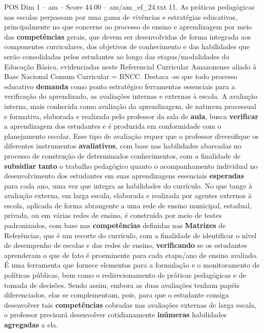 \begin{textsample}{POS Dim 1 – am – Score 44.00 – am/am\_ef\_24.txt}  \label{ex:f1_pos_230}
11.
As práticas pedagógicas nas escolas perpassam por uma gama de vivências e estratégias educativas, principalmente no que concerne ao processo de ensino e aprendizagem por meio das \textbf{competências} gerais, que devem ser desenvolvidas de forma integrada aos componentes curriculares, dos objetivos de conhecimento e das habilidades que serão consolidadas pelos estudantes ao longo das etapas/modalidades da Educação Básica, evidenciadas neste Referencial Curricular Amazonense aliado à Base Nacional Comum Curricular = BNCC.
Destaca -se que todo processo educativo \textbf{demanda} como ponto estratégico ferramentas essenciais para a verificação do aprendizado, as avaliações internas e externas à escola.
A avaliação interna, mais conhecida como avaliação da aprendizagem, de natureza processual e formativa, elaborada e realizada pelo professor da sala de \textbf{aula}, busca \textbf{verificar} a aprendizagem dos estudantes e é produzida em conformidade com o planejamento escolar.
Esse tipo de avaliação requer que o professor diversifique os diferentes instrumentos \textbf{avaliativos}, com base nas habilidades abarcadas no processo de construção de determinados conhecimentos, com a finalidade de \textbf{subsidiar} \textbf{tanto} o trabalho pedagógico quanto o acompanhamento individual no desenvolvimento dos estudantes em suas aprendizagens essenciais \textbf{esperadas} para cada ano, uma vez que integra as habilidades do currículo.
No que tange à avaliação externa, em larga escala, elaborada e realizada por agentes externos à escola, aplicada de forma abrangente a uma rede de ensino municipal, estadual, privada, ou em várias redes de ensino, é construída por meio de testes padronizados, com base nas \textbf{competências} definidas nas \textbf{Matrizes} de Referências, que é um recorte do currículo, com a finalidade de identificar o nível de desempenho de escolas e das redes de ensino, \textbf{verificando} se os estudantes aprenderam o que de fato é proeminente para cada etapa/ano de ensino avaliado.
É uma ferramenta que fornece elementos para a formulação e o monitoramento de políticas públicas, bem como o redirecionamento de práticas pedagógicas e de tomada de decisões.
Sendo assim, embora as duas avaliações tenham papéis diferenciados, elas se complementam, pois, para que o estudante consiga desenvolver tais \textbf{competências} cobradas nas avaliações externas de larga escala, o professor precisará desenvolver cotidianamente \textbf{inúmeras} habilidades \textbf{agregadas} a ela.

\end{textsample}
